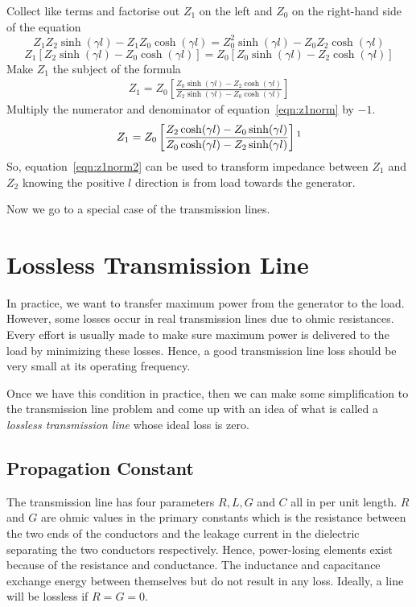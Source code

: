 Collect like terms and factorise out $Z_1$ on the left and $Z_0$ on the right-hand side of the equation
\begin{dmath*}
Z_1Z_2\sinh(\gamma l) - Z_1Z_0\cosh(\gamma l) = Z_0^2\sinh(\gamma l) - Z_0Z_2\cosh(\gamma l)
\end{dmath*}
\begin{dmath*}
Z_1\left[Z_2\sinh(\gamma l) - Z_0\cosh(\gamma l)\right] = Z_0\left[Z_0\sinh(\gamma l) - Z_2\cosh(\gamma l)\right]
\end{dmath*}
Make $Z_1$ the subject of the formula
\begin{align}
Z_1 = Z_0\left[\frac{Z_0\sinh(\gamma l) - Z_2\cosh(\gamma l)}{Z_2\sinh(\gamma l) - Z_0\cosh(\gamma l)}\right]
\label{eqn:z1norm}
\end{align}
Multiply the numerator and denominator of equation~\eqref{eqn:z1norm} by $-1$.
\begin{equation}
Z_1 = Z_0\left[\frac{Z_2\cosh(\gamma l) - Z_0\sinh(\gamma l)}{Z_0\cosh(\gamma l) - Z_2\sinh(\gamma l)}\right]\footnotemark
\label{eqn:z1norm2}
\end{equation}
So, equation~\eqref{eqn:z1norm2} can be used to transform impedance between $Z_1$ and $Z_2$ knowing the positive $l$ direction is from load towards the generator.

Now we go to a special case of the transmission lines.

\section{Lossless Transmission Line}
In practice, we want to transfer maximum power from the generator to the load. However, some losses occur in real transmission lines due to ohmic resistances. Every effort is usually made to make sure maximum power is delivered to the load by minimizing these losses. Hence, a good transmission line loss should be very small at its operating frequency.

Once we have this condition in practice, then we can make some simplification to the transmission line problem and come up with an idea of what is called a \emph{lossless transmission line} whose ideal loss is zero.

\subsection{Propagation Constant}
The transmission line has four parameters $R, L, G$ and $C$ all in per unit length. $R$ and $G$ are ohmic values in the primary constants which is the resistance between the two ends of the conductors and the leakage current in the dielectric separating the two conductors respectively. Hence, power-losing elements exist because of the resistance and conductance. The inductance and capacitance exchange energy between themselves but do not result in any loss. Ideally, a line will be lossless if $R = G = 0$.

